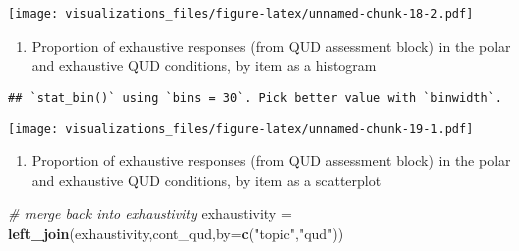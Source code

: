 \documentclass[]{article}
\newenvironment{Shaded}{\begin{snugshade}}{\end{snugshade}}
\newcommand{\KeywordTok}[1]{\textcolor[rgb]{0.13,0.29,0.53}{\textbf{#1}}}
\newcommand{\DataTypeTok}[1]{\textcolor[rgb]{0.13,0.29,0.53}{#1}}
\newcommand{\DecValTok}[1]{\textcolor[rgb]{0.00,0.00,0.81}{#1}}
\newcommand{\StringTok}[1]{\textcolor[rgb]{0.31,0.60,0.02}{#1}}
\newcommand{\CommentTok}[1]{\textcolor[rgb]{0.56,0.35,0.01}{\textit{#1}}}
\newcommand{\OperatorTok}[1]{\textcolor[rgb]{0.81,0.36,0.00}{\textbf{#1}}}
\newcommand{\NormalTok}[1]{#1}
\providecommand{\tightlist}{%
  \setlength{\itemsep}{0pt}\setlength{\parskip}{0pt}}
\begin{document}
\texttt{[image: visualizations\_files/figure-latex/unnamed-chunk-18-2.pdf]}

\begin{enumerate}
\def\labelenumi{\arabic{enumi}.}
\setcounter{enumi}{9}
\tightlist
\item
  Proportion of exhaustive responses (from QUD assessment block) in the
  polar and exhaustive QUD conditions, by item as a histogram
\end{enumerate}

\begin{Shaded}
\end{Shaded}

\begin{verbatim}
## `stat_bin()` using `bins = 30`. Pick better value with `binwidth`.
\end{verbatim}

\texttt{[image: visualizations\_files/figure-latex/unnamed-chunk-19-1.pdf]}

\begin{enumerate}
\def\labelenumi{\arabic{enumi}.}
\setcounter{enumi}{10}
\tightlist
\item
  Proportion of exhaustive responses (from QUD assessment block) in the
  polar and exhaustive QUD conditions, by item as a scatterplot
\end{enumerate}

\begin{Shaded}
\begin{Highlighting}[]
\CommentTok{# merge back into exhaustivity}
\NormalTok{exhaustivity =}\StringTok{ }\KeywordTok{left_join}\NormalTok{(exhaustivity,cont_qud,}\DataTypeTok{by=}\KeywordTok{c}\NormalTok{(}\StringTok{"topic"}\NormalTok{,}\StringTok{"qud"}\NormalTok{))}
\end{Highlighting}
\end{Shaded}
\end{document}
